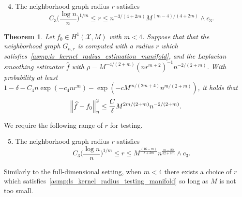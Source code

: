 \documentclass[twoside]{article}
\newcommand{\1}{\mathbf{1}}
\newcommand{\Xset}{\mathcal{X}}
\newcommand{\wh}[1]{\widehat{#1}}
\newtheorem{theorem}{Theorem}
\theoremstyle{definition}
\theoremstyle{remark}
\begin{document}
\begin{enumerate}[label=(R\arabic*)]
	\setcounter{enumi}{3}
	\item 
	\label{asmp:ls_kernel_radius_estimation_manifold}
	The neighborhood graph radius $r$ satisfies
	\begin{equation*}
	C_3\biggl(\frac{\log n}{n}\biggr)^{1/m} \leq r \leq n^{-3/(4 + 2m)} M^{(m - 4)/(4 + 2m)} \wedge c_3.
	\end{equation*}
\end{enumerate}
\begin{theorem}
	\label{thm:laplacian_smoothing_estimation_manifold}
	Let $f_0 \in H^1(\Xset,M)$ with $m < 4$. Suppose that that the neighborhood graph $G_{n,r}$ is computed with a radius $r$ which satisfies~\ref{asmp:ls_kernel_radius_estimation_manifold},  and the Laplacian smoothing estimator $\wh{f}$ with $\rho = M^{-4/(2 + m)} (nr^{m + 2})^{-1} n^{-2/(2 + m)}$. With probability at least $1 - \delta -  C_4n\exp(-c_4nr^m) - \exp(-c M^{m/(2m + 4)} n^{m/(2+m)})$, it holds that
	\begin{equation*}
	\Bigl\|\wh{f} - f_0\Bigr\|_n^2 \leq \frac{C}{\delta} M^{2m/(2 + m)} n^{-2/(2 + m)}.
	\end{equation*}
\end{theorem}

We require the following range of $r$ for testing.
\begin{enumerate}[label=(R\arabic*)]
	\setcounter{enumi}{4}
	\item 
	\label{asmp:ls_kernel_radius_testing_manifold}
	The neighborhood graph radius $r$ satisfies
	\begin{equation*}
	C_3\biggl(\frac{\log n}{n}\biggr)^{1/m} \leq r \leq M^{\frac{(16 - m)}{8 + 2m}}n^{\frac{m - 20}{32 + 8m}} \wedge c_3.
	\end{equation*}
\end{enumerate}
Similarly to the full-dimensional setting, when $m < 4$ there exists a choice of $r$ which satisfies~\ref{asmp:ls_kernel_radius_testing_manifold} so long as $M$ is not too small.
\end{document}
